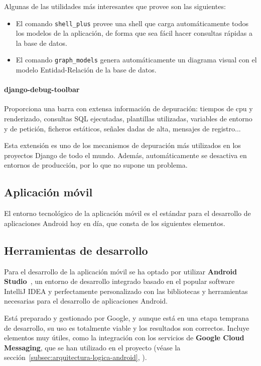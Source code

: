 Algunas de las utilidades más interesantes que provee son las siguientes:

\begin{itemize}
\item El comando \texttt{shell\_plus} provee una shell que carga automáticamente
  todos los modelos de la aplicación, de forma que sea fácil hacer consultas
  rápidas a la base de datos.
\item El comando \texttt{graph\_models} genera automáticamente un diagrama
  visual con el modelo Entidad-Relación de la base de datos.
\end{itemize}

\paragraph{django-debug-toolbar}

Proporciona una barra con extensa información de depuración: tiempos de cpu y
renderizado, consultas SQL ejecutadas, plantillas utilizadas, variables de
entorno y de petición, ficheros estáticos, señales dadas de alta, mensajes de
registro...

Esta extensión es uno de los mecanismos de depuración más utilizados en los
proyectos Django de todo el mundo. Además, automáticamente se desactiva en
entornos de producción, por lo que no supone un problema.

\subsection{Aplicación móvil}

El entorno tecnológico de la aplicación móvil es el estándar para el desarrollo
de aplicaciones Android hoy en día, que consta de los siguientes elementos.

\subsection{Herramientas de desarrollo}

Para el desarrollo de la aplicación móvil se ha optado por utilizar
\textbf{Android Studio}~\cite{android-studio}, un entorno de desarrollo
integrado basado en el popular software IntelliJ IDEA y perfectamente
personalizado con las bibliotecas y herramientas necesarias para el desarrollo
de aplicaciones Android.

Está preparado y gestionado por Google, y aunque está en una etapa temprana de
desarrollo, su uso es totalmente viable y los resultados son correctos. Incluye
elementos muy útiles, como la integración con los servicios de \textbf{Google
  Cloud Messaging}, que se han utilizado en el proyecto (véase la
sección~\ref{subsec:arquitectura-logica-android},
\textit{}).


